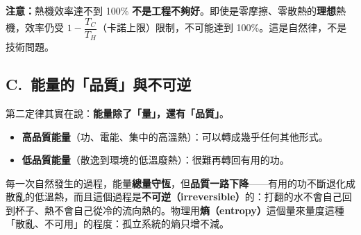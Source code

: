 \documentclass[11pt]{article}
\begin{document}
\textbf{注意：}熱機效率達不到 100\% \textbf{不是工程不夠好}。即使是零摩擦、零散熱的\textbf{理想}熱機，效率仍受 $1-\dfrac{T_C}{T_H}$（卡諾上限）限制，不可能達到 100\%。這是自然律，不是技術問題。

\subsection*{\sffamily C.\ 能量的「品質」與不可逆}

第二定律其實在說：\textbf{能量除了「量」，還有「品質」}。

\begin{itemize}\setlength{\itemsep}{1pt}
\item \textbf{高品質能量}（功、電能、集中的高溫熱）：可以轉成幾乎任何其他形式。
\item \textbf{低品質能量}（散逸到環境的低溫廢熱）：很難再轉回有用的功。
\end{itemize}

每一次自然發生的過程，能量\textbf{總量守恆}，但\textbf{品質一路下降}——有用的功不斷退化成散亂的低溫熱，而且這個過程是\textbf{不可逆（irreversible）}的：打翻的水不會自己回到杯子、熱不會自己從冷的流向熱的。物理用\textbf{熵（entropy）}這個量來量度這種「散亂、不可用」的程度：孤立系統的熵只增不減。
\end{document}
